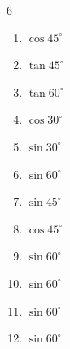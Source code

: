 \begin{multicols}{6}
\begin{enumerate}

  \item $\displaystyle \cos{45^\circ}$


  \item $\displaystyle \tan{45^\circ}$

        \phantom{$\displaystyle =1$}

\columnbreak %

  \item $\displaystyle \tan{60^\circ}$


  \item $\displaystyle \cos{30^\circ}$


  \item $\displaystyle \sin{30^\circ}$


  \item $\displaystyle \sin{60^\circ}$


  \item $\displaystyle \sin{45^\circ}$


  \item $\displaystyle \cos{45^\circ}$


  \item $\displaystyle \sin{60^\circ}$


  \item $\displaystyle \sin{60^\circ}$


  \item $\displaystyle \sin{60^\circ}$


  \item $\displaystyle \sin{60^\circ}$


\end{enumerate}
\end{multicols}
